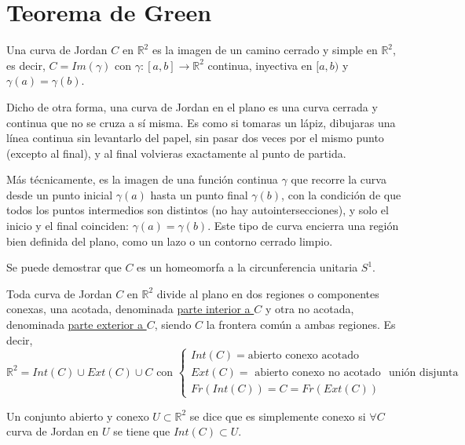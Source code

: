 \section{Teorema de Green}
\begin{definición}
Una curva de Jordan $C$ en $\mathbb{R}^2$ es la imagen de un camino cerrado y simple en $\mathbb{R}^2$, es decir, $C = Im(\gamma)$ con $\gamma: [a,b] \to \mathbb{R}^2$ continua, inyectiva en $[a, b)$ y $\gamma(a) = \gamma(b)$.
\end{definición}
Dicho de otra forma, una curva de Jordan en el plano es una curva cerrada y continua que no se cruza a sí misma. Es como si tomaras un lápiz, dibujaras una línea continua sin levantarlo del papel, sin pasar dos veces por el mismo punto (excepto al final), y al final volvieras exactamente al punto de partida.

Más técnicamente, es la imagen de una función continua \( \gamma \) que recorre
la curva desde un punto inicial \( \gamma(a) \) hasta un punto final \(
\gamma(b) \), con la condición de que todos los puntos intermedios son
distintos (no hay autointersecciones), y solo el inicio y el final coinciden:
\( \gamma(a) = \gamma(b) \). Este tipo de curva encierra una región bien
definida del plano, como un lazo o un contorno cerrado limpio.\\

\begin{observación}
Se puede demostrar que $C$ es un homeomorfa a la circunferencia unitaria $S^1$.
\end{observación}
\begin{teorema}
    Toda curva de Jordan $C$ en $\mathbb{R}^2$ divide al plano en dos regiones  o componentes conexas, una acotada, denominada \underline{parte interior a $C$} y otra no acotada, denominada \underline{parte exterior a $C$}, siendo $C$ la frontera común a ambas regiones. Es decir,
    $$\mathbb{R}^2 = Int(C) \cup Ext(C) \cup C \text{ con } \begin{cases}
            Int(C) = \text{abierto conexo acotado} \\ Ext(C) = \text{ abierto conexo no acotado} \\ Fr(Int(C)) = C = Fr(Ext(C))
        \end{cases} \text{ unión disjunta}$$
\end{teorema}
\begin{definición}
Un conjunto abierto y conexo $U \subset \mathbb{R}^2$ se dice que es simplemente conexo si $\forall C$ curva de Jordan en $U$ se tiene que $Int(C) \subset U$.
\end{definición}

